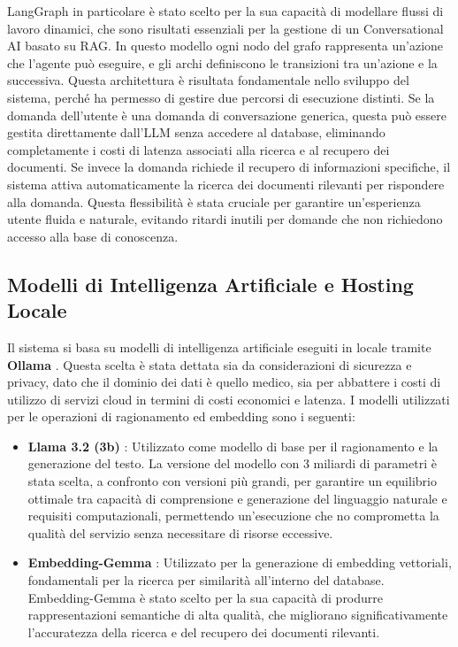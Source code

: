 LangGraph in particolare è stato scelto per la sua capacità di modellare flussi di lavoro dinamici, che sono risultati essenziali per la gestione di un Conversational AI basato su RAG. In questo modello ogni nodo del grafo rappresenta un'azione che l'agente può eseguire, e gli archi definiscono le transizioni tra un'azione e la successiva. Questa architettura è risultata fondamentale nello sviluppo del sistema, perché ha permesso di gestire due percorsi di esecuzione distinti. Se la domanda dell'utente è una domanda di conversazione generica, questa può essere gestita direttamente dall'LLM senza accedere al database, eliminando completamente i costi di latenza associati alla ricerca e al recupero dei documenti. Se invece la domanda richiede il recupero di informazioni specifiche, il sistema attiva automaticamente la ricerca dei documenti rilevanti per rispondere alla domanda. Questa flessibilità è stata cruciale per garantire un'esperienza utente fluida e naturale, evitando ritardi inutili per domande che non richiedono accesso alla base di conoscenza.

\subsection{Modelli di Intelligenza Artificiale e Hosting Locale}

Il sistema si basa su modelli di intelligenza artificiale eseguiti in locale tramite \textbf{Ollama} \cite{ollama}. Questa scelta è stata dettata sia da considerazioni di sicurezza e privacy, dato che il dominio dei dati è quello medico, sia per abbattere i costi di utilizzo di servizi cloud in termini di costi economici e latenza. I modelli utilizzati per le operazioni di ragionamento ed embedding sono i seguenti:

\begin{itemize}
    \item \textbf{Llama 3.2 (3b)} \cite{dubey2024llama3}: Utilizzato come modello di base per il ragionamento e la generazione del testo. La versione del modello con 3 miliardi di parametri è stata scelta, a confronto con versioni più grandi, per garantire un equilibrio ottimale tra capacità di comprensione e generazione del linguaggio naturale e requisiti computazionali, permettendo un'esecuzione che no comprometta la qualità del servizio senza necessitare di risorse eccessive.

    \item \textbf{Embedding-Gemma} \cite{embedding_gemma_2025}: Utilizzato per la generazione di embedding vettoriali, fondamentali per la ricerca per similarità all'interno del database. Embedding-Gemma è stato scelto per la sua capacità di produrre rappresentazioni semantiche di alta qualità, che migliorano significativamente l'accuratezza della ricerca e del recupero dei documenti rilevanti.
\end{itemize}

